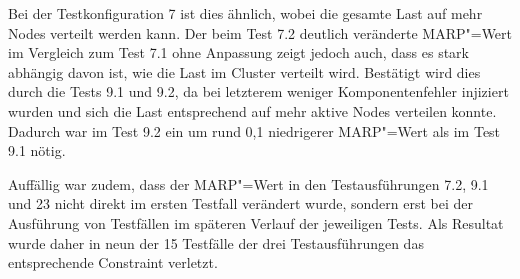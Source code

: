 Bei der Testkonfiguration 7 ist dies ähnlich, wobei die gesamte Last auf mehr Nodes verteilt werden kann.
Der beim Test 7.2 deutlich veränderte \gls{MARP}"=Wert im Vergleich zum Test 7.1 ohne Anpassung zeigt jedoch auch, dass es stark abhängig davon ist, wie die Last im Cluster verteilt wird.
Bestätigt wird dies durch die Tests 9.1 und 9.2, da bei letzterem weniger Komponentenfehler injiziert wurden und sich die Last entsprechend auf mehr aktive Nodes verteilen konnte.
Dadurch war im Test 9.2 ein um rund 0,1 niedrigerer \gls{MARP}"=Wert als im Test 9.1 nötig.

Auffällig war zudem, dass der \gls{MARP}"=Wert in den Testausführungen 7.2, 9.1 und 23 nicht direkt im ersten Testfall verändert wurde, sondern erst bei der Ausführung von Testfällen im späteren Verlauf der jeweiligen Tests.
Als Resultat wurde daher in neun der 15 Testfälle der drei Testausführungen das entsprechende Constraint verletzt.
